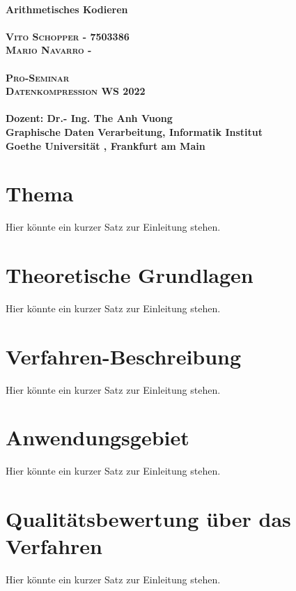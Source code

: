 \documentclass[a4paper]{article}
\theoremstyle{definition}
\theoremstyle{remark}
\begin{document}
	\begin{titlepage}
	
	\begin{center}

		\huge \textbf{\textsf{
		\\Arithmetisches Kodieren}} \\
		\LARGE\textbf{\textsc{\\
		Vito Schopper - 7503386
		\\
		Mario Navarro - }}\\ 
		\vspace{2cm}
		\LARGE\textbf{\textsc{\\Pro-Seminar
		\\ Datenkompression WS 2022}}\\ 
		\vspace{2.5cm}
		\large \textbf{
		\\
				Dozent: {Dr.- Ing. The Anh Vuong} \\
Graphische Daten Verarbeitung, Informatik Institut
\\
Goethe Universität , Frankfurt am Main
}
	\end{center}

\end{titlepage}
\tableofcontents\newpage
	
	\section{Thema}
	Hier könnte ein kurzer Satz zur Einleitung stehen.
	
		\section{Theoretische Grundlagen}
	Hier könnte ein kurzer Satz zur Einleitung stehen.
	
		\section{Verfahren-Beschreibung}

	Hier könnte ein kurzer Satz zur Einleitung stehen.
	
		\section{Anwendungsgebiet}
	Hier könnte ein kurzer Satz zur Einleitung stehen.
	
			\section{Qualitätsbewertung über das Verfahren}
	Hier könnte ein kurzer Satz zur Einleitung stehen.
	
\end{document}
